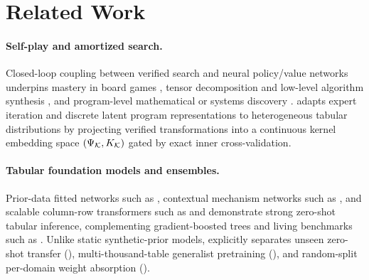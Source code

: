 \section{Related Work}
\label{sec:related}

\paragraph{Self-play and amortized search.}
Closed-loop coupling between verified search and neural policy/value networks underpins mastery in board games \citep{silver2016alphago,silver2017zero,silver2018alphazero,schrittwieser2020muzero}, tensor decomposition and low-level algorithm synthesis \citep{fawzi2022alphatensor,mankowitz2023alphadev}, and program-level mathematical or systems discovery \citep{romeraparedes2024funsearch,novikov2025alphaevolve,anthony2017exit}. \EZ{} adapts expert iteration \citep{anthony2017exit} and discrete latent program representations \citep{ellis2021dreamcoder,balog2017deepcoder,hong2021latent} to heterogeneous tabular distributions by projecting verified transformations into a continuous kernel embedding space $(\Psi_{\mathcal{K}}, K_{\mathcal{K}})$ gated by exact inner cross-validation.

\paragraph{Tabular foundation models and ensembles.}
Prior-data fitted networks such as  \citep{hollmann2025tabpfn}, contextual mechanism networks such as  \citep{zhang2026limix2}, and scalable column-row transformers such as  \citep{qu2025tabicl} and  \citep{bonet2024hyperfast} demonstrate strong zero-shot tabular inference, complementing gradient-boosted trees \citep{chen2016xgboost,ke2017lightgbm,prokhorenkova2018catboost,grinsztajn2022trees} and living benchmarks such as  \citep{erickson2025tabarena}. Unlike static synthetic-prior models, \EZ{} explicitly separates unseen zero-shot transfer (\regfair{}), multi-thousand-table generalist pretraining (\regincorpus{}), and random-split per-domain weight absorption (\regrecall{}).
